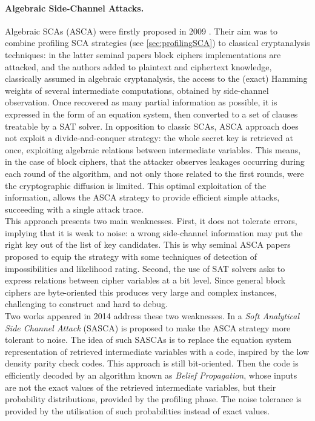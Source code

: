 \paragraph*{Algebraic Side-Channel Attacks.}\label{sec:ASCA}
Algebraic SCAs (ASCA) were firstly proposed in 2009 \cite{ASCA,renauld2009algebraic}. Their aim was to combine profiling SCA strategies (see \ref{sec:profilingSCA}) to classical cryptanalysis techniques: in the latter seminal papers block ciphers implementations are attacked, and the authors added to plaintext and ciphertext knowledge, classically assumed in algebraic cryptanalysis, the access to the (exact) Hamming weights of  several intermediate computations, obtained by side-channel observation. Once recovered as many partial information as possible, it is expressed in the form of an equation system, then converted to a set of clauses treatable by a SAT solver. In opposition to classic SCAs, ASCA approach does not exploit a divide-and-conquer strategy: the whole secret key is retrieved at once, exploiting algebraic relations between intermediate variables. This means, in the case of block ciphers, that the attacker observes leakages occurring during each round of the algorithm, and not only those related to the first rounds, were the cryptographic diffusion is limited. This optimal exploitation of the information, allows the ASCA strategy to provide efficient simple attacks, \ie succeeding with a single attack trace.\\
This approach presents two main weaknesses. First, it does not tolerate errors, implying that it is weak to noise: a wrong side-channel information may put the right key out of the list of key candidates. This is why seminal ASCA papers proposed to equip the strategy with some techniques of detection of impossibilities and likelihood rating. Second, the use of SAT solvers asks to express relations between cipher variables at a bit level. Since general block ciphers are byte-oriented this produces very large and complex instances, challenging to construct and hard to debug.\\
Two works appeared in 2014 address these two weaknesses. In \cite{soft} a \emph{Soft Analytical Side Channel Attack} (SASCA) is proposed to make the ASCA strategy more tolerant to noise. The idea of such SASCAs is to replace the equation system representation of retrieved intermediate variables with a code, inspired by the low density parity check codes. This approach is still bit-oriented. Then the code is efficiently decoded by an algorithm known as \emph{Belief Propagation}, whose inputs are not the exact values of the retrieved intermediate variables, but their probability distributions, provided by the profiling phase. The noise tolerance is provided by the utilisation of such probabilities instead of exact values. \\
